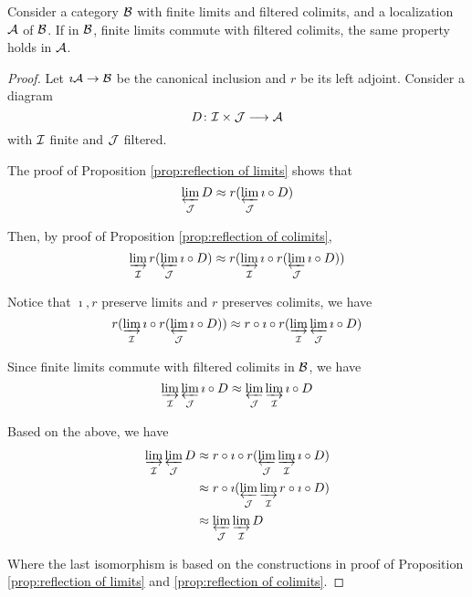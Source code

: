   \begin{prop}
    Consider a category ${\cal B}$ with finite limits and filtered colimits, and a localization ${\cal A}$ of ${\cal B}$. If in ${\cal B}$, finite limits commute with filtered colimits, the same property holds in ${\cal A}$.
  \end{prop}
  \begin{proof}
    Let $\imath{\cal A}\to{\cal B}$ be the canonical inclusion and $r$ be its left adjoint. Consider a diagram
    \begin{equation*}
      D\colon{\cal I}\times{\cal J}\longrightarrow{\cal A}
    \end{equation*}
    with ${\cal I}$ finite and ${\cal J}$ filtered.

    The proof of Proposition \ref{prop:reflection of limits} shows that
    \begin{equation*}
      \operatorname*{\underleftarrow{\lim}}_{{\cal J}}D \approx r(\operatorname*{\underleftarrow{\lim}}_{{\cal J}}\imath\circ D)
    \end{equation*}

    Then, by proof of Proposition \ref{prop:reflection of colimits},
    \begin{equation*}
      \operatorname*{\underrightarrow{\lim}}_{{\cal I}}r(\operatorname*{\underleftarrow{\lim}}_{{\cal J}}\imath\circ D) \approx r(\operatorname*{\underrightarrow{\lim}}_{{\cal I}}\imath\circ r(\operatorname*{\underleftarrow{\lim}}_{{\cal J}}\imath\circ D))
    \end{equation*}

    Notice that $\imath,r$ preserve limits and $r$ preserves colimits, we have
    \begin{equation*}
       r(\operatorname*{\underrightarrow{\lim}}_{{\cal I}}\imath\circ r(\operatorname*{\underleftarrow{\lim}}_{{\cal J}}\imath\circ D)) \approx r\circ\imath\circ r (\operatorname*{\underrightarrow{\lim}}_{{\cal I}}\operatorname*{\underleftarrow{\lim}}_{{\cal J}}\imath\circ D)
    \end{equation*}

    Since finite limits commute with filtered colimits in ${\cal B}$, we have
    \begin{equation*}
       \operatorname*{\underrightarrow{\lim}}_{{\cal I}}\operatorname*{\underleftarrow{\lim}}_{{\cal J}}\imath\circ D \approx \operatorname*{\underleftarrow{\lim}}_{{\cal J}}\operatorname*{\underrightarrow{\lim}}_{{\cal I}}\imath\circ D
    \end{equation*}

    Based on the above, we have
    \begin{align*}
      \operatorname*{\underrightarrow{\lim}}_{{\cal I}}\operatorname*{\underleftarrow{\lim}}_{{\cal J}}D &\approx r\circ\imath\circ r (\operatorname*{\underleftarrow{\lim}}_{{\cal J}}\operatorname*{\underrightarrow{\lim}}_{{\cal I}}\imath\circ D) \\
                                                  &\approx r\circ\imath (\operatorname*{\underleftarrow{\lim}}_{{\cal J}}\operatorname*{\underrightarrow{\lim}}_{{\cal I}}r\circ\imath\circ D)  \\
                                                  &\approx \operatorname*{\underleftarrow{\lim}}_{{\cal J}}\operatorname*{\underrightarrow{\lim}}_{{\cal I}}D
    \end{align*}

    Where the last isomorphism is based on the constructions in proof of Proposition \ref{prop:reflection of limits} and \ref{prop:reflection of colimits}.
  \end{proof}


